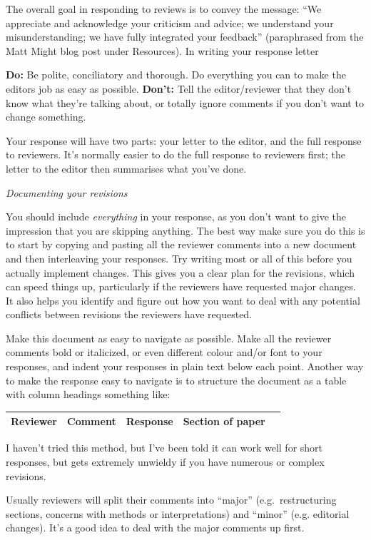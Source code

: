 \documentclass[11pt,]{article}
\begin{document}
The overall goal in responding to reviews is to convey the message: ``We
appreciate and acknowledge your criticism and advice; we understand your
misunderstanding; we have fully integrated your feedback'' (paraphrased
from the Matt Might blog post under Resources). In writing your response
letter

\textbf{Do:} Be polite, conciliatory and thorough. Do everything you can
to make the editors job as easy as possible. \newline{} \textbf{Don't:}
Tell the editor/reviewer that they don't know what they're talking
about, or totally ignore comments if you don't want to change something.

Your response will have two parts: your letter to the editor, and the
full response to reviewers. It's normally easier to do the full response
to reviewers first; the letter to the editor then summarises what you've
done. \bigskip{}

\emph{Documenting your revisions}

You should include \emph{everything} in your response, as you don't want
to give the impression that you are skipping anything. The best way make
sure you do this is to start by copying and pasting all the reviewer
comments into a new document and then interleaving your responses. Try
writing most or all of this before you actually implement changes. This
gives you a clear plan for the revisions, which can speed things up,
particularly if the reviewers have requested major changes. It also
helps you identify and figure out how you want to deal with any
potential conflicts between revisions the reviewers have requested.

Make this document as easy to navigate as possible. Make all the
reviewer comments bold or italicized, or even different colour and/or
font to your responses, and indent your responses in plain text below
each point. Another way to make the response easy to navigate is to
structure the document as a table with column headings something like:

\begin{tabular}{ | l | c | c | c | r | }
\hline
    Reviewer & Comment & Response & Section of paper\\
\hline
\end{tabular}

I haven't tried this method, but I've been told it can work well for
short responses, but gets extremely unwieldy if you have numerous or
complex revisions.

Usually reviewers will split their comments into ``major''
(e.g.~restructuring sections, concerns with methods or interpretations)
and ``minor'' (e.g. editorial changes). It's a good idea to deal with
the major comments up first.
\end{document}
